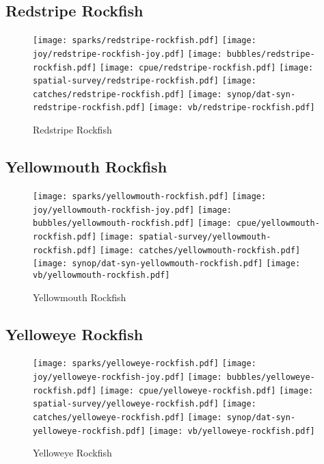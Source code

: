 \subsection*{Redstripe Rockfish}

\begin{figure}[htbp]
\centering
\texttt{[image: sparks/redstripe-rockfish.pdf]}
\texttt{[image: joy/redstripe-rockfish-joy.pdf]}
\texttt{[image: bubbles/redstripe-rockfish.pdf]}
\texttt{[image: cpue/redstripe-rockfish.pdf]}
\texttt{[image: spatial-survey/redstripe-rockfish.pdf]}
\texttt{[image: catches/redstripe-rockfish.pdf]}
\texttt{[image: synop/dat-syn-redstripe-rockfish.pdf]}
\texttt{[image: vb/redstripe-rockfish.pdf]}
\caption{Redstripe Rockfish}
\end{figure}
\clearpage
\subsection*{Yellowmouth Rockfish}

\begin{figure}[htbp]
\centering
\texttt{[image: sparks/yellowmouth-rockfish.pdf]}
\texttt{[image: joy/yellowmouth-rockfish-joy.pdf]}
\texttt{[image: bubbles/yellowmouth-rockfish.pdf]}
\texttt{[image: cpue/yellowmouth-rockfish.pdf]}
\texttt{[image: spatial-survey/yellowmouth-rockfish.pdf]}
\texttt{[image: catches/yellowmouth-rockfish.pdf]}
\texttt{[image: synop/dat-syn-yellowmouth-rockfish.pdf]}
\texttt{[image: vb/yellowmouth-rockfish.pdf]}
\caption{Yellowmouth Rockfish}
\end{figure}
\clearpage
\subsection*{Yelloweye Rockfish}

\begin{figure}[htbp]
\centering
\texttt{[image: sparks/yelloweye-rockfish.pdf]}
\texttt{[image: joy/yelloweye-rockfish-joy.pdf]}
\texttt{[image: bubbles/yelloweye-rockfish.pdf]}
\texttt{[image: cpue/yelloweye-rockfish.pdf]}
\texttt{[image: spatial-survey/yelloweye-rockfish.pdf]}
\texttt{[image: catches/yelloweye-rockfish.pdf]}
\texttt{[image: synop/dat-syn-yelloweye-rockfish.pdf]}
\texttt{[image: vb/yelloweye-rockfish.pdf]}
\caption{Yelloweye Rockfish}
\end{figure}
\clearpage
